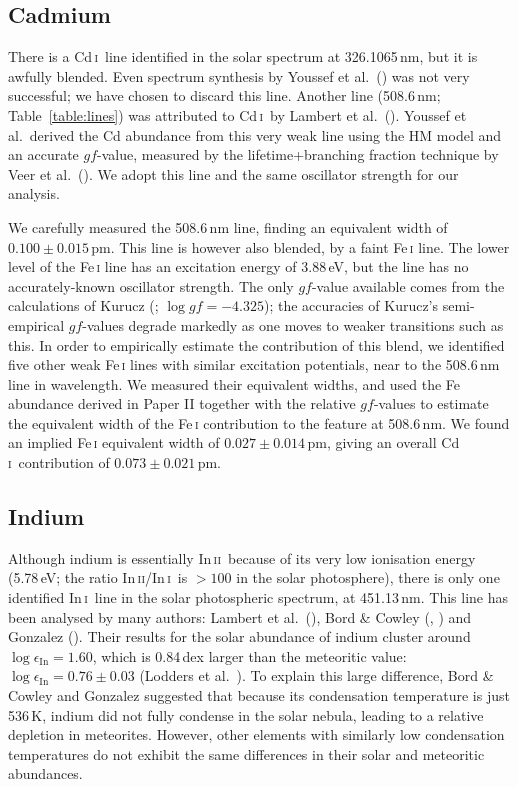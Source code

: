 \documentclass[traditabstract]{aa}
\newcommand{\altcdi}{Cd\,\textsc{i}}
\newcommand{\altini}{In\,\textsc{i}}
\newcommand{\altinii}{In\,\textsc{ii}}
\newcommand{\cdi}{\altcdi\ }
\newcommand{\ini}{\altini\ }
\newcommand{\inii}{\altinii\ }
\begin{document}
\subsection{Cadmium}
There is a \cdi line identified in the solar spectrum at 326.1065\,nm, but it is awfully blended. Even spectrum synthesis by Youssef et al.\ (\cite{yous}) was not very successful; we have chosen to discard this line. Another line (508.6\,nm; Table~\ref{table:lines}) was attributed to \cdi by Lambert et al.\ (\cite{lamb}). Youssef et al.\ derived the Cd abundance from this very weak line using the HM model and an accurate $gf$-value, measured by the lifetime+branching fraction technique by Veer et al.\ (\cite{veer}). We adopt this line and the same oscillator strength for our analysis.

We carefully measured the 508.6\,nm line, finding an equivalent width of $0.100\pm0.015$\,pm.  This line is however also blended, by a faint Fe\,\textsc{i} line.  The lower level of the Fe\,\textsc{i} line has an excitation energy of 3.88\,eV, but the line has no accurately-known oscillator strength. The only $gf$-value available comes from the calculations of Kurucz (\cite{kur}; $\log gf=-4.325$);  the accuracies of Kurucz's semi-empirical $gf$-values degrade markedly as one moves to weaker transitions such as this.  In order to empirically estimate the contribution of this blend, we identified five other weak Fe\,\textsc{i} lines with similar excitation potentials, near to the 508.6\,nm line in wavelength.  We measured their equivalent widths, and used the Fe abundance derived in Paper II together with the relative $gf$-values to estimate the equivalent width of the Fe\,\textsc{i} contribution to the feature at 508.6\,nm.  We found an implied Fe\,\textsc{i} equivalent width of $0.027\pm0.014$\,pm, giving an overall \cdi contribution of $0.073\pm0.021$\,pm.

\subsection{Indium}
Although indium is essentially \inii because of its very low ionisation energy (5.78\,eV; the ratio \altinii/\ini is $>$$100$ in the solar photosphere), there is only one identified \ini line in the solar photospheric spectrum, at 451.13\,nm.  This line has been analysed by many authors: Lambert et al.\ (\cite{lamb}), Bord \& Cowley (\cite{bord}, \cite{bord1}) and Gonzalez (\cite{gonz}). Their results for the solar abundance of indium cluster around $\log\epsilon_{\mathrm{In}}= 1.60$, which is 0.84\,dex larger than the meteoritic value: $\log\epsilon_{\mathrm{In}}= 0.76\pm0.03$ (Lodders et al.\ \cite{lodd}). To explain this large difference, Bord \& Cowley and Gonzalez suggested that because its condensation temperature is just 536\,K, indium did not fully condense in the solar nebula, leading 
to a relative depletion in meteorites.  However, other elements with similarly low condensation temperatures do not exhibit the same differences in their solar and meteoritic abundances.
\end{document}
